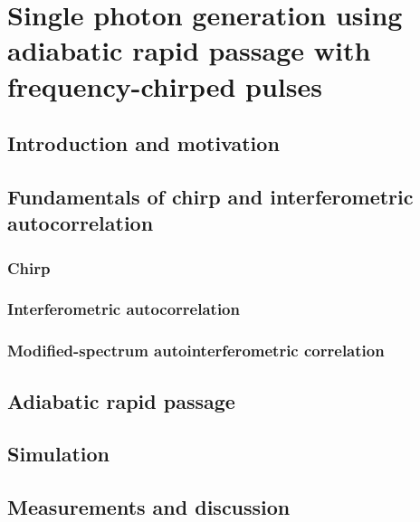 \chapter{Single photon generation using adiabatic rapid passage with frequency-chirped pulses}

\section{Introduction and motivation}

\section{Fundamentals of chirp and interferometric autocorrelation}

\subsection{Chirp}

\subsection{Interferometric autocorrelation}

\subsection{Modified-spectrum autointerferometric correlation}

\section{Adiabatic rapid passage}

\section{Simulation}

\section{Measurements and discussion}